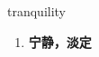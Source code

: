 
\begin{frame}
{\huge tranquility}
\begin{center}
\begin{enumerate}\Large
  \item \textbf{宁静，淡定}
\end{enumerate}
\end{center}
\end{frame}
